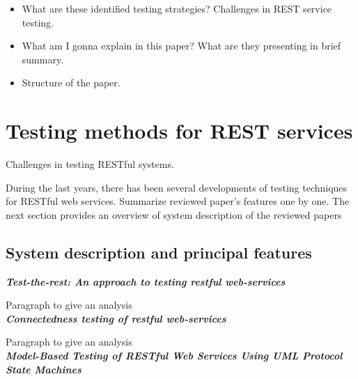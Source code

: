 \documentclass[english]{tktltiki}
\begin{document}

\begin{itemize}
\item What are these identified testing strategies? Challenges in REST service testing.

\item What am I gonna explain in this paper? What are they presenting in brief summary.

\item Structure of the paper.
\end{itemize}

\section{Testing methods for REST services}
Challenges in testing RESTful systems.

During the last years, there has been several developments of testing techniques for RESTful web services. Summarize reviewed paper's features one by one. The next section provides an overview of system description of the reviewed papers

\subsection{System description and principal features}
\textbf{\textit{Test-the-rest: An approach to testing restful web-services \cite{chakrabarti2009test}}}

Paragraph to give an analysis 
\\

\textit{\textbf{Connectedness testing of restful web-services \cite{chakrabarti2010connectedness}}}

Paragraph to give an analysis 
\\

\textit{\textbf{Model-Based Testing of RESTful Web Services Using UML Protocol State Machines \cite{pinheiro2013model}}}
\end{document}
